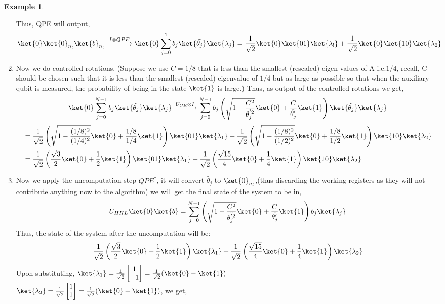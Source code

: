 \documentclass[12pt, oneside]{book}
\theoremstyle{definition}
\theoremstyle{definition}
\newtheorem{example}{Example}[section]
\theoremstyle{remark}
\begin{document}
\begin{example}
\begin{enumerate}
    Thus, QPE will output,
    \[
    \ket{0}\ket{0}_{n_l}\ket{b}_{n_b}\xrightarrow{I \otimes QPE} \ket{0}\sum_{j=0}^1b_j\ket{\tilde{\theta_j}}\ket{\lambda_j}=\frac{1}{\sqrt{2}}\ket{0}\ket{01}\ket{\lambda_!}+\frac{1}{\sqrt{2}}\ket{0}\ket{10}\ket{\lambda_2}
    \]
    \item Now we do controlled rotations. (Suppose we use $C=1/8$ that is less than the smallest (rescaled) eigen values of A i.e.$1/4$, recall, C should be chosen such that it is less than the smallest (rescaled) eigenvalue of $1/4$ but as large as possible so that when the auxiliary qubit is measured, the probability of being in the state $\ket{1}$ is large.)
    Thus, as output of the controlled rotations we get,
    \[
    \ket{0}\sum_{j=0}^{N-1}b_j\ket{\tilde{\theta_j}}\ket{\lambda_j}\xrightarrow{U_{CR} \otimes I} \sum_{j=0}^{N-1} b_j \left(\sqrt{1-\frac{C^2}{\tilde{\theta^{'2}_j}}}\ket{0}+\frac{C}{\tilde{\theta_j'}}\ket{1}\right)\ket{\tilde{\theta_j}}\ket{\lambda_j}
    \]
    \begin{align*}
        &=\frac{1}{\sqrt{2}}\left(\sqrt{1-\frac{(1/8)^2}{(1/4)^2}}\ket{0}+\frac{1/8}{1/4}\ket{1}\right)\ket{01}\ket{\lambda_1}+\frac{1}{\sqrt{2}}\left(\sqrt{1-\frac{(1/8)^2}{(1/2)^2}}\ket{0}+\frac{1/8}{1/2}\ket{1}\right)\ket{10}\ket{\lambda_2}\\
    &=\frac{1}{\sqrt{2}}\left(\frac{\sqrt{3}}{2}\ket{0}+\frac{1}{2}\ket{1}\right)\ket{01}\ket{\lambda_1}+\frac{1}{\sqrt{2}}\left(\frac{\sqrt{15}}{4}\ket{0}+\frac{1}{4}\ket{1}\right)\ket{10}\ket{\lambda_2}\\
    \end{align*}
    \item Now we apply the uncomputation step $QPE^{\dagger}$, it will convert $\tilde{\theta_j}$ to $\ket{0}_{n_l}$,(thus discarding the working registers as they will not contribute anything now to the algorithm) we will get the final state of the system to be in,
    \[
    U_{HHL}\ket{0}\ket{b}=\sum_{j=0}^{N-1} \left(\sqrt{1-\frac{C^2}{\tilde{\theta^{'2}_j}}}\ket{0}+\frac{C}{\tilde{\theta_j'}}\ket{1}\right)b_j\ket{\lambda_j}
    \]
    Thus, the state of the system after the uncomputation will be:
    \[
    \frac{1}{\sqrt{2}}\left(\frac{\sqrt{3}}{2}\ket{0}+\frac{1}{2}\ket{1}\right)\ket{\lambda_1}+\frac{1}{\sqrt{2}}\left(\frac{\sqrt{15}}{4}\ket{0}+\frac{1}{4}\ket{1}\right)\ket{\lambda_2}
    \]
    Upon substituting, $\ket{\lambda_1}=\frac{1}{\sqrt{2}}\begin{bmatrix} 1 \\ -1 \end{bmatrix}= \frac{1}{\sqrt{2}}(\ket{0}-\ket{1})$\\$ \ket{\lambda_2}=\frac{1}{\sqrt{2}}\begin{bmatrix}1 \\ 1 \end{bmatrix} =\frac{1}{\sqrt{2}}(\ket{0}+\ket{1})$, we get,

\end{enumerate}
\end{example}
\end{document}
